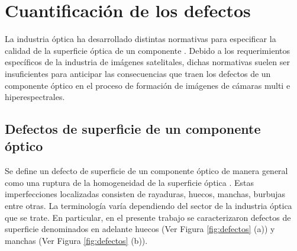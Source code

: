 

\singlespacing
\chapter{Cuantificación de los defectos}
\label{chap:zeiss}

\hspace{0.5cm}La industria óptica ha desarrollado distintas normativas para especificar la calidad de la superficie óptica de un componente \cite{cosm}. Debido a los requerimientos específicos de la industria de imágenes satelitales, dichas normativas suelen ser insuficientes para anticipar las consecuencias que traen los defectos de un componente óptico en el proceso de formación de imágenes de cámaras multi e hiperespectrales.

\singlespacing
\section{Defectos de superficie de un componente óptico}
\label{sec:defectsurf}

\hspace{0.5cm}Se define un defecto de superficie de un componente óptico de manera general como una ruptura de la homogeneidad de la superficie óptica \cite{Gomez_1998}. Estas imperfecciones localizadas consisten de rayaduras, huecos, manchas, burbujas entre otras. La terminología varía dependiendo del sector de la industria óptica que se trate. En particular, en el presente trabajo se caracterizaron defectos de superficie denominados en adelante huecos (Ver Figura \ref{fig:defectos} (a)) y manchas (Ver Figura \ref{fig:defectos} (b)).  

